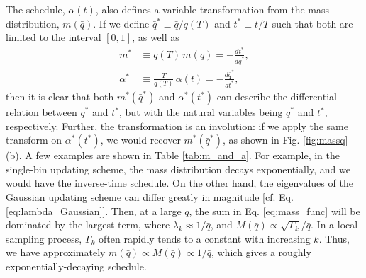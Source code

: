 \documentclass[preprint, superscriptaddress, floatfix]{revtex4-1}
\begin{document}
The schedule, $\alpha(t)$,
also defines a variable transformation from
the mass distribution, $m(\bar q)$.
%
If we define
$\bar q^* \equiv \bar q/q(T)$
and $t^* \equiv t/T$
such that both are limited to the interval $[0, 1]$,
as well as
\begin{align*}
  m^*       &\equiv q(T) \, m(\bar q) = -\frac{ dt^* } { d\bar q^* },
  \\
  \alpha^*  &\equiv \frac{T}{q(T)} \, \alpha(t) = -\frac{ d\bar q^* } { dt^* },
\end{align*}
then it is clear that
both $m^*(\bar q^*)$ and $\alpha^*(t^*)$
can describe the differential relation
between $\bar q^*$ and $t^*$,
but with the natural variables
being $\bar q^*$ and $t^*$, respectively.
%
Further, the transformation is an involution:
if we apply the same transform on $\alpha^*(t^*)$,
we would recover $m^*(\bar q^*)$,
as shown in Fig. \ref{fig:massq}(b).
%
A few examples are shown in Table \ref{tab:m_and_a}.
%
For example, in the single-bin updating scheme,
the mass distribution decays exponentially,
and we would have the inverse-time schedule.
%
On the other hand,
the eigenvalues of the Gaussian updating scheme
can differ greatly in magnitude
[cf. Eq. \eqref{eq:lambda_Gaussian}].
%
Then, at a large $\bar q$,
the sum in Eq. \eqref{eq:mass_func} will be dominated by
the largest term, where $\lambda_k \approx 1/\bar q$,
and $M(\bar q) \propto \sqrt{\Gamma_k}/\bar q$.
%
In a local sampling process,
$\Gamma_k$ often rapidly tends to a constant
with increasing $k$.
%
Thus, we have approximately 
$m(\bar q) \propto M(\bar q) \propto 1/\bar q$,
which gives a roughly exponentially-decaying schedule.
\end{document}
